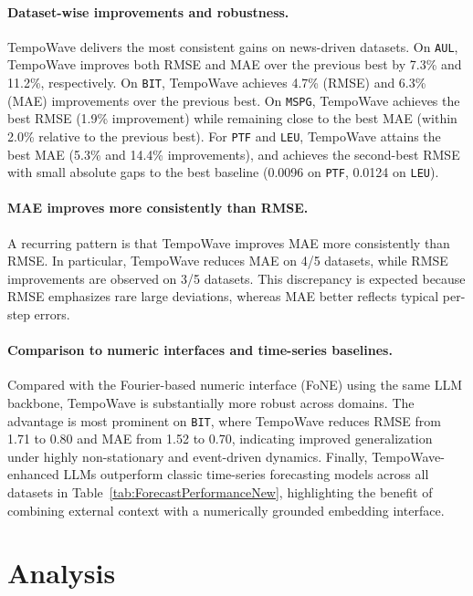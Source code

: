 \documentclass{article}
\begin{document}
\paragraph{Dataset-wise improvements and robustness.}
TempoWave delivers the most consistent gains on news-driven datasets.
On \texttt{AUL}, TempoWave improves both RMSE and MAE over the previous best by {7.3\%} and {11.2\%}, respectively.
On \texttt{BIT}, TempoWave achieves {4.7\%} (RMSE) and {6.3\%} (MAE) improvements over the previous best.
On \texttt{MSPG}, TempoWave achieves the best RMSE ({1.9\%} improvement) while remaining close to the best MAE (within {2.0\%} relative to the previous best).
For \texttt{PTF} and \texttt{LEU}, TempoWave attains the best MAE ({5.3\%} and {14.4\%} improvements), and achieves the second-best RMSE with small absolute gaps to the best baseline (0.0096 on \texttt{PTF}, 0.0124 on \texttt{LEU}).

\paragraph{MAE improves more consistently than RMSE.}
A recurring pattern is that TempoWave improves MAE more consistently than RMSE.
In particular, TempoWave reduces MAE on 4/5 datasets, while RMSE improvements are observed on 3/5 datasets.
This discrepancy is expected because RMSE emphasizes rare large deviations, whereas MAE better reflects typical per-step errors.


\paragraph{Comparison to numeric interfaces and time-series baselines.}
Compared with the Fourier-based numeric interface (FoNE) using the same LLM backbone, TempoWave is substantially more robust across domains.
The advantage is most prominent on \texttt{BIT}, where TempoWave reduces RMSE from 1.71 to 0.80 and MAE from 1.52 to 0.70, indicating improved generalization under highly non-stationary and event-driven dynamics.
Finally, TempoWave-enhanced LLMs outperform classic time-series forecasting models across all datasets in Table~\ref{tab:ForecastPerformanceNew}, highlighting the benefit of combining external context with a numerically grounded embedding interface.



\section{Analysis}
\end{document}
